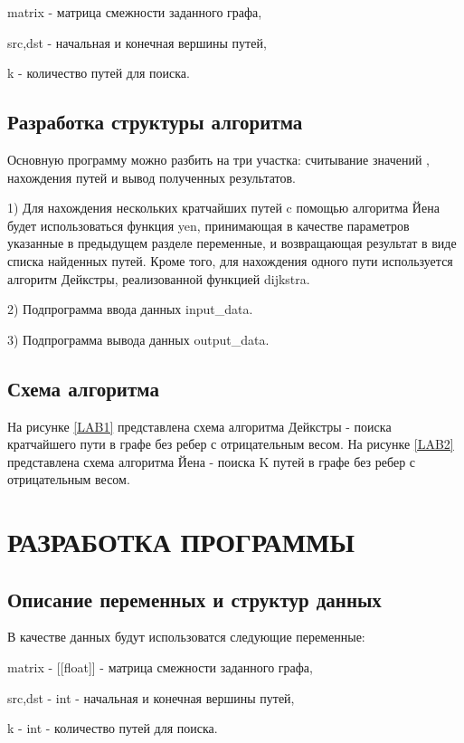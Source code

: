 matrix - матрица смежности заданного графа,

src,dst - начальная и конечная вершины путей,

k - количество путей для поиска.

\subsection{Разработка структуры алгоритма}
Основную программу можно разбить на три участка: считывание значений , нахождения путей и вывод полученных результатов.

1) Для нахождения нескольких кратчайших путей c помощью алгоритма Йена будет использоваться функция yen, принимающая в качестве параметров указанные в предыдущем разделе переменные, и возвращающая результат в виде списка найденных путей. Кроме того, для нахождения одного пути используется алгоритм Дейкстры, реализованной функцией dijkstra.
 
2) Подпрограмма ввода данных input\_data.

3) Подпрограмма вывода данных output\_data.
\subsection{Схема алгоритма}
На рисунке \ref{LAB1} представлена схема алгоритма Дейкстры - поиска кратчайшего пути в графе без ребер с отрицательным весом.
На рисунке \ref{LAB2} представлена схема алгоритма Йена - поиска K путей в графе без ребер с отрицательным весом.
\section{РАЗРАБОТКА ПРОГРАММЫ}
\subsection{Описание переменных и структур данных}
В качестве данных будут использоватся следующие переменные:

matrix - [[float]] - матрица смежности заданного графа,

src,dst - int - начальная и конечная вершины путей,

k - int - количество путей для поиска.
